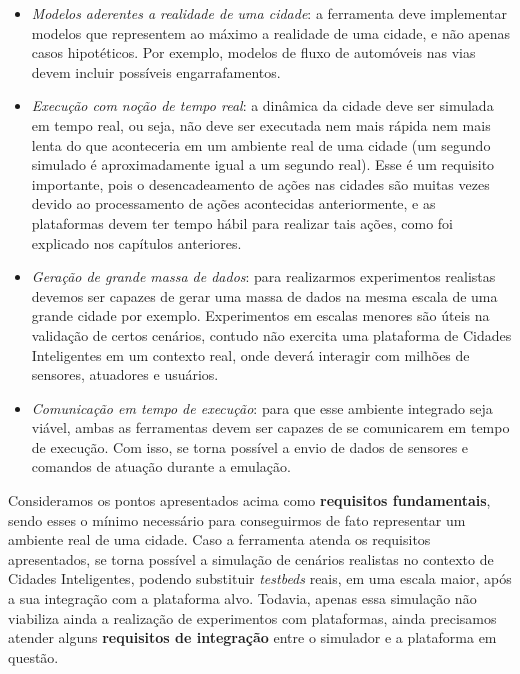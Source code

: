 \begin{itemize}
    \item \textit{Modelos aderentes a realidade de uma cidade}: a ferramenta deve implementar modelos que representem ao máximo a realidade de uma cidade, e não apenas casos hipotéticos.
        Por exemplo, modelos de fluxo de automóveis nas vias devem incluir possíveis engarrafamentos.

    \item \textit{Execução com noção de tempo real}: a dinâmica da cidade deve ser simulada em tempo real, ou seja, não deve ser executada nem mais rápida nem mais lenta do que aconteceria
        em um ambiente real de uma cidade (um segundo simulado é aproximadamente igual a um segundo real).
        Esse é um requisito importante, pois o desencadeamento de ações nas cidades são muitas vezes devido ao processamento de ações acontecidas anteriormente, e as plataformas
        devem ter tempo hábil para realizar tais ações, como foi explicado nos capítulos anteriores.

    \item \textit{Geração de grande massa de dados}: para realizarmos experimentos realistas devemos ser capazes de gerar uma massa de dados na mesma escala de uma grande cidade por
        exemplo.
        Experimentos em escalas menores são úteis na validação de certos cenários, contudo não exercita uma plataforma de Cidades Inteligentes em um contexto real, onde deverá
        interagir com milhões de sensores, atuadores e usuários.

    \item \textit{Comunicação em tempo de execução}: para que esse ambiente integrado seja viável, ambas as ferramentas devem ser capazes de se comunicarem em tempo de execução.
        Com isso, se torna possível a envio de dados de sensores e comandos de atuação durante a emulação.
\end{itemize}

Consideramos os pontos apresentados acima como \textbf{requisitos fundamentais}, sendo esses o mínimo necessário para conseguirmos de fato representar um ambiente real de uma cidade.
Caso a ferramenta atenda os requisitos apresentados, se torna possível a simulação de cenários realistas no contexto de Cidades Inteligentes, podendo substituir \textit{testbeds}
reais, em uma escala maior, após a sua integração com a plataforma alvo.
Todavia, apenas essa simulação não viabiliza ainda a realização de experimentos com plataformas, ainda precisamos atender alguns \textbf{requisitos de integração} entre o simulador
e a plataforma em questão.

